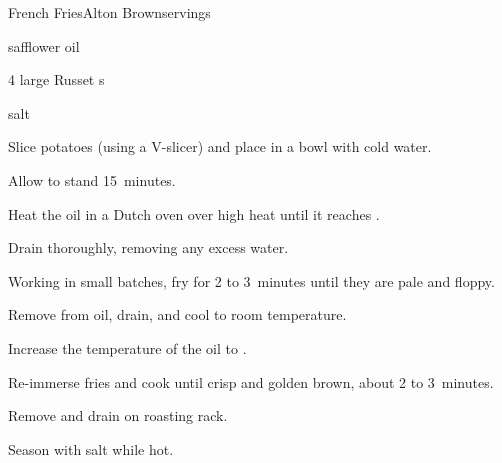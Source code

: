 \begin{recipe}{French Fries}{Alton Brown}{servings}


\begin{ingredients}
\item {} safflower oil
\item 4 large Russet s
\item salt
\end{ingredients}

\begin{directions}
\item Slice potatoes (using a V-slicer) and place in a bowl with cold water.
\item Allow to stand 15~minutes.
\item Heat the oil in a Dutch oven over high heat until it reaches .
\item Drain thoroughly, removing any excess water.
\item Working in small batches, fry for 2 to 3~minutes until they are pale and floppy.
\item Remove from oil, drain, and cool to room temperature.
\item Increase the temperature of the oil to .
\item Re-immerse fries and cook until crisp and golden brown, about 2 to 3~minutes.
\item Remove and drain on roasting rack.
\item Season with salt while hot.
\end{directions}

\end{recipe}
